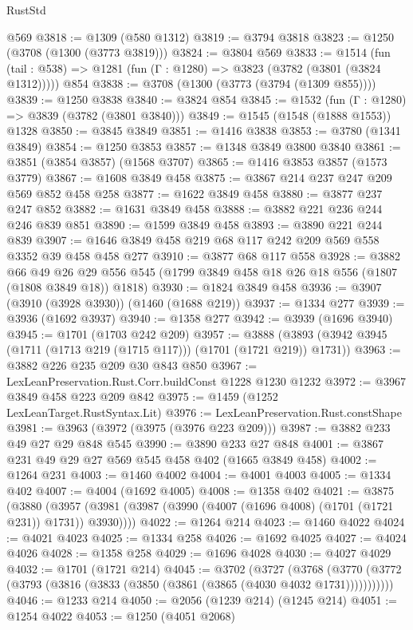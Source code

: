 \begin{lexlean}{RustStd}
\begin{coremodule}
{\begin{coremodule}
{{{{{{{{{{{{{    @569
@3818 := @1309 (@580 @1312)
@3819 := @3794 @3818
@3823 := @1250 (@3708 (@1300 (@3773 @3819)))
@3824 := @3804 @569
@3833 := @1514
    (fun (tail : @538) => @1281 (fun (Γ : @1280) => @3823 (@3782 (@3801 (@3824 @1312)))))
    @854
@3838 := @3708 (@1300 (@3773 (@3794 (@1309 @855))))
@3839 := @1250 @3838
@3840 := @3824 @854
@3845 := @1532 (fun (Γ : @1280) => @3839 (@3782 (@3801 @3840)))
@3849 := @1545 (@1548 (@1888 @1553)) @1328
@3850 := @3845 @3849
@3851 := @1416 @3838
@3853 := @3780 (@1341 @3849)
@3854 := @1250 @3853
@3857 := @1348 @3849 @3800 @3840
@3861 := @3851 (@3854 @3857) (@1568 @3707)
@3865 := @1416 @3853 @3857 (@1573 @3779)
@3867 := @1608 @3849 @458
@3875 := @3867 @214 @237 @247 @209 @569 @852 @458 @258
@3877 := @1622 @3849 @458
@3880 := @3877 @237 @247 @852
@3882 := @1631 @3849 @458
@3888 := @3882 @221 @236 @244 @246 @839 @851
@3890 := @1599 @3849 @458
@3893 := @3890 @221 @244 @839
@3907 := @1646 @3849 @458 @219 @68 @117 @242 @209 @569 @558 @3352 @39 @458 @458 @277
@3910 := @3877 @68 @117 @558
@3928 := @3882
    @66
    @49
    @26
    @29
    @556
    @545
    (@1799 @3849 @458 @18 @26 @18 @556 (@1807 (@1808 @3849 @18)) @1818)
@3930 := @1824 @3849 @458
@3936 := @3907 (@3910 (@3928 @3930)) (@1460 (@1688 @219))
@3937 := @1334 @277
@3939 := @3936 (@1692 @3937)
@3940 := @1358 @277
@3942 := @3939 (@1696 @3940)
@3945 := @1701 (@1703 @242 @209)
@3957 := @3888 (@3893 (@3942 @3945 (@1711 (@1713 @219 (@1715 @117))) (@1701 (@1721 @219)) @1731))
@3963 := @3882 @226 @235 @209 @30 @843 @850
@3967 := LexLeanPreservation.Rust.Corr.buildConst @1228 @1230 @1232
@3972 := @3967 @3849 @458 @223 @209 @842
@3975 := @1459 (@1252 LexLeanTarget.RustSyntax.Lit)
@3976 := LexLeanPreservation.Rust.constShape
@3981 := @3963 (@3972 (@3975 (@3976 @223 @209)))
@3987 := @3882 @233 @49 @27 @29 @848 @545
@3990 := @3890 @233 @27 @848
@4001 := @3867 @231 @49 @29 @27 @569 @545 @458 @402 (@1665 @3849 @458)
@4002 := @1264 @231
@4003 := @1460 @4002
@4004 := @4001 @4003
@4005 := @1334 @402
@4007 := @4004 (@1692 @4005)
@4008 := @1358 @402
@4021 := @3875
    (@3880 (@3957 (@3981 (@3987 (@3990 (@4007 (@1696 @4008) (@1701 (@1721 @231)) @1731)) @3930))))
@4022 := @1264 @214
@4023 := @1460 @4022
@4024 := @4021 @4023
@4025 := @1334 @258
@4026 := @1692 @4025
@4027 := @4024 @4026
@4028 := @1358 @258
@4029 := @1696 @4028
@4030 := @4027 @4029
@4032 := @1701 (@1721 @214)
@4045 := @3702
    (@3727
      (@3768 (@3770 (@3772 (@3793 (@3816 (@3833 (@3850 (@3861 (@3865 (@4030 @4032 @1731)))))))))))
@4046 := @1233 @214
@4050 := @2056 (@1239 @214) (@1245 @214)
@4051 := @1254 @4022
@4053 := @1250 (@4051 @2068)
}}}}}}}}}}}}}
\end{coremodule}}
\end{coremodule}
\end{lexlean}
